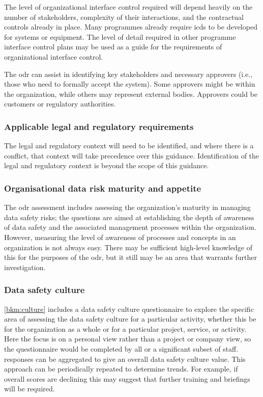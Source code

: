 The level of organizational interface control required will depend heavily on the number of \glspl{stakeholder}, complexity of their interactions, and the contractual controls already in place. Many programmes already require \glspl{icd} to be developed for systems or equipment. The level of detail required in other programme interface control plans may be used as a guide for the requirements of organizational interface control. 

The \gls{odr} can assist in identifying key \glspl{stakeholder} and necessary approvers (i.e., those who need to formally accept the system). Some approvers might be within the organization, while others may represent external bodies. Approvers could be customers or regulatory authorities.

\subsubsection{Applicable legal and regulatory requirements}
The legal and regulatory context will need to be identified, and where there is a conflict, that context will take precedence over this guidance. Identification of the legal and regulatory context is beyond the scope of this guidance.
\subsubsection{Organisational data risk maturity and appetite}
The \gls{odr} assessment includes assessing the organization's maturity in managing data safety risks; the questions are aimed at establishing the depth of awareness of data safety and the associated management processes within the organization. However, measuring the level of awareness of processes and concepts in an organization is not always easy. There may be sufficient high-level knowledge of this for the purposes of the \gls{odr}, but it still may be an area that warrants further investigation.

\subsubsection{Data safety culture}
\autoref{bkm:culture} includes a data safety culture questionnaire to explore the specific area of assessing the data safety culture for a particular activity, whether this be for the organization as a whole or for a particular project, service, or activity. Here the focus is on a personal view rather than a project or company view, so the questionnaire would be completed by all or a significant subset of staff. \Glspl{response} can be aggregated to give an overall data safety culture value. This approach can be periodically repeated to determine trends. For example, if overall scores are declining this may suggest that further training and briefings will be required.

